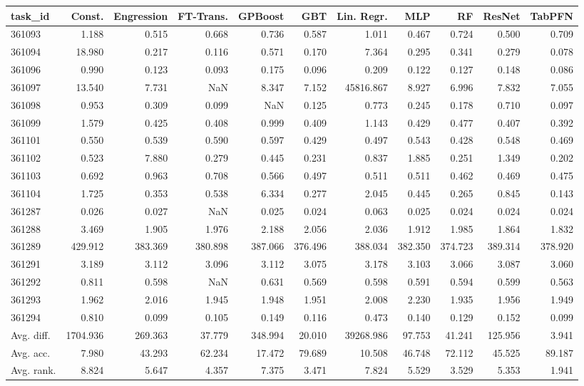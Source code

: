 \begin{tabular}{lrrrrrrrrrr}
\toprule
task\_id & Const. & Engression & FT-Trans. & GPBoost & GBT & Lin. Regr. & MLP & RF & ResNet & TabPFN \\
\midrule
361093 & 1.188 & 0.515 & 0.668 & 0.736 & 0.587 & 1.011 & 0.467 & 0.724 & 0.500 & 0.709 \\
361094 & 18.980 & 0.217 & 0.116 & 0.571 & 0.170 & 7.364 & 0.295 & 0.341 & 0.279 & 0.078 \\
361096 & 0.990 & 0.123 & 0.093 & 0.175 & 0.096 & 0.209 & 0.122 & 0.127 & 0.148 & 0.086 \\
361097 & 13.540 & 7.731 & NaN & 8.347 & 7.152 & 45816.867 & 8.927 & 6.996 & 7.832 & 7.055 \\
361098 & 0.953 & 0.309 & 0.099 & NaN & 0.125 & 0.773 & 0.245 & 0.178 & 0.710 & 0.097 \\
361099 & 1.579 & 0.425 & 0.408 & 0.999 & 0.409 & 1.143 & 0.429 & 0.477 & 0.407 & 0.392 \\
361101 & 0.550 & 0.539 & 0.590 & 0.597 & 0.429 & 0.497 & 0.543 & 0.428 & 0.548 & 0.469 \\
361102 & 0.523 & 7.880 & 0.279 & 0.445 & 0.231 & 0.837 & 1.885 & 0.251 & 1.349 & 0.202 \\
361103 & 0.692 & 0.963 & 0.708 & 0.566 & 0.497 & 0.511 & 0.511 & 0.462 & 0.469 & 0.475 \\
361104 & 1.725 & 0.353 & 0.538 & 6.334 & 0.277 & 2.045 & 0.445 & 0.265 & 0.845 & 0.143 \\
361287 & 0.026 & 0.027 & NaN & 0.025 & 0.024 & 0.063 & 0.025 & 0.024 & 0.024 & 0.024 \\
361288 & 3.469 & 1.905 & 1.976 & 2.188 & 2.056 & 2.036 & 1.912 & 1.985 & 1.864 & 1.832 \\
361289 & 429.912 & 383.369 & 380.898 & 387.066 & 376.496 & 388.034 & 382.350 & 374.723 & 389.314 & 378.920 \\
361291 & 3.189 & 3.112 & 3.096 & 3.112 & 3.075 & 3.178 & 3.103 & 3.066 & 3.087 & 3.060 \\
361292 & 0.811 & 0.598 & NaN & 0.631 & 0.569 & 0.598 & 0.591 & 0.594 & 0.599 & 0.563 \\
361293 & 1.962 & 2.016 & 1.945 & 1.948 & 1.951 & 2.008 & 2.230 & 1.935 & 1.956 & 1.949 \\
361294 & 0.810 & 0.099 & 0.105 & 0.149 & 0.116 & 0.473 & 0.140 & 0.129 & 0.152 & 0.099 \\
Avg. diff. & 1704.936 & 269.363 & 37.779 & 348.994 & 20.010 & 39268.986 & 97.753 & 41.241 & 125.956 & 3.941 \\
Avg. acc. & 7.980 & 43.293 & 62.234 & 17.472 & 79.689 & 10.508 & 46.748 & 72.112 & 45.525 & 89.187 \\
Avg. rank. & 8.824 & 5.647 & 4.357 & 7.375 & 3.471 & 7.824 & 5.529 & 3.529 & 5.353 & 1.941 \\
\bottomrule
\end{tabular}
